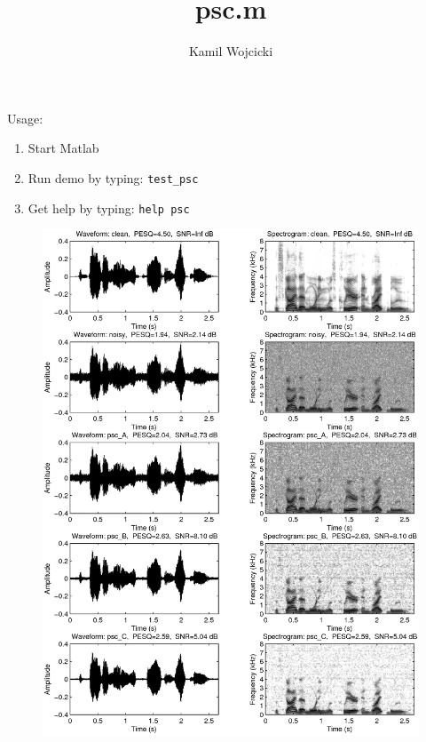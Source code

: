 \documentclass[a4paper,11pt,twoside,onecolumn]{article}
\title{psc.m}
\author{Kamil Wojcicki}
\begin{document}
\maketitle
\pagestyle{plain}

Usage:

\begin{enumerate}
\item Start Matlab
\item Run demo by typing: \texttt{test\_psc}
\item Get help by typing: \texttt{help psc}
\end{enumerate}


\vspace{5mm}
{\tiny}
\clearpage

\begin{figure}[!t]
    \centering
    \includegraphics[width=0.9\linewidth]{test_psc.eps}
\end{figure}
\clearpage

{\tiny}
\clearpage

{\tiny}
\end{document}
